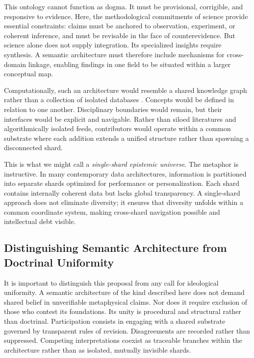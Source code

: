 \documentclass[12pt]{article}
\begin{document}
This ontology cannot function as dogma. It must be provisional, corrigible, and responsive to evidence. Here, the methodological commitments of science provide essential constraints: claims must be anchored to observation, experiment, or coherent inference, and must be revisable in the face of counterevidence. But science alone does not supply integration. Its specialized insights require synthesis. A semantic architecture must therefore include mechanisms for cross-domain linkage, enabling findings in one field to be situated within a larger conceptual map.

Computationally, such an architecture would resemble a shared knowledge graph rather than a collection of isolated databases \citep{HoganEtAl2021}. Concepts would be defined in relation to one another. Disciplinary boundaries would remain, but their interfaces would be explicit and navigable. Rather than siloed literatures and algorithmically isolated feeds, contributors would operate within a common substrate where each addition extends a unified structure rather than spawning a disconnected shard.

This is what we might call a \emph{single-shard epistemic universe}. The metaphor is instructive. In many contemporary data architectures, information is partitioned into separate shards optimized for performance or personalization. Each shard contains internally coherent data but lacks global transparency. A single-shard approach does not eliminate diversity; it ensures that diversity unfolds within a common coordinate system, making cross-shard navigation possible and intellectual debt visible.

\subsection{Distinguishing Semantic Architecture from Doctrinal Uniformity}

It is important to distinguish this proposal from any call for ideological uniformity. A semantic architecture of the kind described here does not demand shared belief in unverifiable metaphysical claims. Nor does it require exclusion of those who contest its foundations. Its unity is procedural and structural rather than doctrinal. Participation consists in engaging with a shared substrate governed by transparent rules of revision. Disagreements are recorded rather than suppressed. Competing interpretations coexist as traceable branches within the architecture rather than as isolated, mutually invisible shards.
\end{document}
